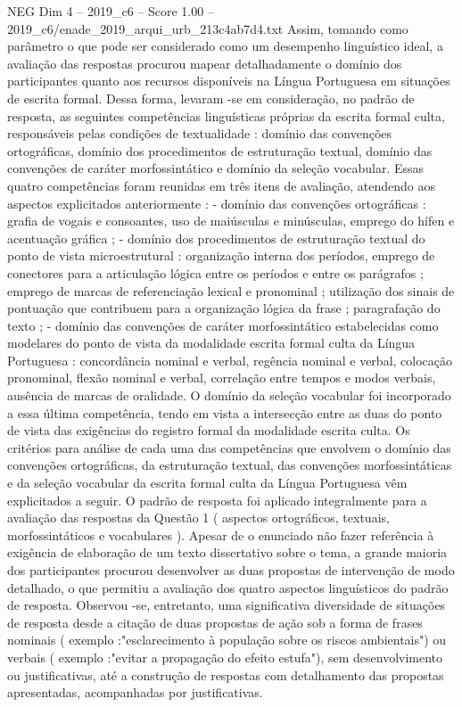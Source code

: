 \begin{textsample}{NEG Dim 4 – 2019\_c6 – Score 1.00 – 2019\_c6/enade\_2019\_arqui\_urb\_213c4ab7d4.txt}
Assim, tomando como parâmetro o que pode ser considerado como um desempenho linguístico ideal, a avaliação das respostas procurou mapear detalhadamente o domínio dos participantes quanto aos recursos disponíveis na Língua Portuguesa em situações de escrita formal.
Dessa forma, levaram -se em consideração, no padrão de resposta, as seguintes competências linguísticas próprias da escrita formal culta, responsáveis pelas condições de textualidade : domínio das convenções ortográficas, domínio dos procedimentos de estruturação textual, domínio das convenções de caráter morfossintático e domínio da seleção vocabular.
Essas quatro competências foram reunidas em três itens de avaliação, atendendo aos aspectos explicitados anteriormente : - domínio das convenções ortográficas : grafia de vogais e consoantes, uso de maiúsculas e minúsculas, emprego do hífen e acentuação gráfica ; - domínio dos procedimentos de estruturação textual do ponto de vista microestrutural : organização interna dos períodos, emprego de conectores para a articulação lógica entre os períodos e entre os parágrafos ; emprego de marcas de referenciação lexical e pronominal ; utilização dos sinais de pontuação que contribuem para a organização lógica da frase ; paragrafação do texto ; - domínio das convenções de caráter morfossintático estabelecidas como modelares do ponto de vista da modalidade escrita formal culta da Língua Portuguesa : concordância nominal e verbal, regência nominal e verbal, colocação pronominal, flexão nominal e verbal, correlação entre tempos e modos verbais, ausência de marcas de oralidade.
O domínio da seleção vocabular foi incorporado a essa última competência, tendo em vista a intersecção entre as duas do ponto de vista das exigências do registro formal da modalidade escrita culta.
Os critérios para análise de cada uma das competências que envolvem o domínio das convenções ortográficas, da estruturação textual, das convenções morfossintáticas e da seleção vocabular da escrita formal culta da Língua Portuguesa vêm explicitados a seguir.
O padrão de resposta foi aplicado integralmente para a avaliação das respostas da Questão 1 ( aspectos ortográficos, textuais, morfossintáticos e vocabulares ).
Apesar de o enunciado não fazer referência à exigência de elaboração de um texto dissertativo sobre o tema, a grande maioria dos participantes procurou desenvolver as duas propostas de intervenção de modo detalhado, o que permitiu a avaliação dos quatro aspectos linguísticos do padrão de resposta.
Observou -se, entretanto, uma significativa diversidade de situações de resposta desde a citação de duas propostas de ação sob a forma de frases nominais ( exemplo :"esclarecimento à população sobre os riscos ambientais") ou verbais ( exemplo :"evitar a propagação do efeito estufa"), sem desenvolvimento ou justificativas, até a construção de respostas com detalhamento das propostas apresentadas, acompanhadas por justificativas.

\end{textsample}
